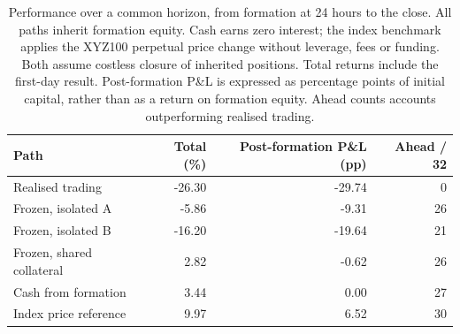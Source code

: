 \begin{table}[htbp]
\centering\small
\caption{Performance over a common horizon, from formation at 24 hours
to the close. All paths inherit formation equity. Cash earns zero interest;
the index benchmark applies the XYZ100 perpetual price change without
leverage, fees or funding. Both assume costless closure of inherited
positions. Total returns include the first-day result. Post-formation P\&L is
expressed as percentage points of initial capital, rather than as a return
on formation equity. Ahead counts accounts outperforming realised trading.}
\label{tab:feedbackbench}
\begin{tabular}{lrrr}
\toprule
Path & Total (\%) & Post-formation P\&L (pp) & Ahead / 32 \\
\midrule
Realised trading & -26.30 & -29.74 & 0 \\
Frozen, isolated A & -5.86 & -9.31 & 26 \\
Frozen, isolated B & -16.20 & -19.64 & 21 \\
Frozen, shared collateral & 2.82 & -0.62 & 26 \\
Cash from formation & 3.44 & 0.00 & 27 \\
Index price reference & 9.97 & 6.52 & 30 \\
\bottomrule
\end{tabular}
\end{table}
